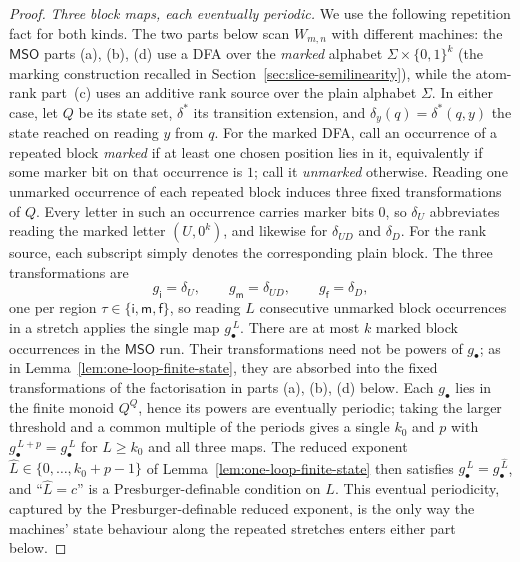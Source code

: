 \documentclass[11pt]{article}
\theoremstyle{definition}
\newcommand{\MSO}{\mathsf{MSO}}
\begin{document}
\begin{proof}
\vspace{0.5em}
\noindent\emph{Three block maps, each eventually periodic.}
We use the following repetition fact for both kinds.  The two parts below
scan $W_{m,n}$ with different machines: the $\MSO$ parts
(a), (b), (d) use a DFA over the \emph{marked} alphabet
$\Sigma\times\{0,1\}^k$ (the marking construction recalled in
Section~\ref{sec:slice-semilinearity}), while the atom-rank part~(c) uses an additive
rank source over the plain alphabet $\Sigma$.  In either case, let $Q$ be its
state set, $\delta^*$ its transition extension, and $\delta_y(q)=\delta^*(q,y)$
the state reached on reading $y$ from $q$.  For the marked DFA, call an
occurrence of a repeated block \emph{marked} if at least one chosen position
lies in it, equivalently if some marker bit on that occurrence is $1$; call it
\emph{unmarked} otherwise.  Reading one unmarked occurrence of each repeated
block induces three fixed transformations of $Q$.  Every letter in such an
occurrence carries marker bits $0$, so $\delta_U$ abbreviates reading the
marked letter $(U,0^k)$, and likewise for $\delta_{UD}$ and $\delta_D$.  For
the rank source, each subscript simply denotes the corresponding plain block.
The three transformations are
\[
   g_{\mathsf i}=\delta_U,\qquad g_{\mathsf m}=\delta_{UD},\qquad
   g_{\mathsf f}=\delta_D,
\]
one per region $\tau\in\{\mathsf i,\mathsf m,\mathsf f\}$, so reading $L$
consecutive unmarked block occurrences in a stretch applies the single map
$g_\bullet^{\,L}$.  There are at most $k$ marked block occurrences in the
$\MSO$ run.  Their transformations need not be powers of $g_\bullet$; as in
Lemma~\ref{lem:one-loop-finite-state}, they are absorbed into the fixed
transformations of the factorisation in parts (a), (b), (d) below.  Each
$g_\bullet$ lies in the finite monoid $Q^Q$, hence its powers are
eventually periodic; taking the larger threshold and a common multiple of the
periods gives a single $k_0$ and $p$ with $g_\bullet^{\,L+p}=g_\bullet^{\,L}$
for $L\ge k_0$ and all three maps.  The reduced exponent
$\widehat L\in\{0,\ldots,k_0+p-1\}$ of Lemma~\ref{lem:one-loop-finite-state}
then satisfies $g_\bullet^{\,L}=g_\bullet^{\,\widehat L}$, and ``$\widehat L=c$''
is a Presburger-definable condition on $L$.  This eventual periodicity, captured by the
Presburger-definable reduced exponent, is the only way the machines' state
behaviour along the repeated stretches enters either part below.


\end{proof}
\end{document}

